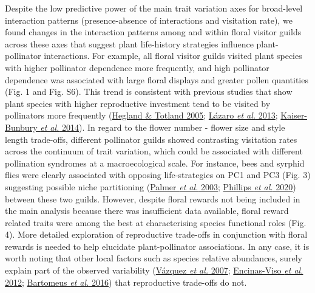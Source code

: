 \documentclass[
  12pt,
  a4paper,
]{article}
\begin{document}
Despite the low predictive power of the main trait variation axes for broad-level interaction patterns (presence-absence of interactions and visitation rate), we found changes in the interaction patterns among and within floral visitor guilds across these axes that suggest plant life-history strategies influence plant-pollinator interactions. For example, all floral visitor guilds visited plant species with higher pollinator dependence more frequently, and high pollinator dependence was associated with large floral displays and greater pollen quantities (Fig. 1 and Fig. S6). This trend is consistent with previous studies that show plant species with higher reproductive investment tend to be visited by pollinators more frequently (\protect\hyperlink{ref-hegland2005}{Hegland \& Totland 2005}; \protect\hyperlink{ref-lazaro2013}{Lázaro \emph{et al.} 2013}; \protect\hyperlink{ref-kaiser2014}{Kaiser-Bunbury \emph{et al.} 2014}). In regard to the flower number - flower size and style length trade-offs, different pollinator guilds showed contrasting visitation rates across the continuum of trait variation, which could be associated with different pollination syndromes at a macroecological scale. For instance, bees and syrphid flies were clearly associated with opposing life-strategies on PC1 and PC3 (Fig. 3) suggesting possible niche partitioning (\protect\hyperlink{ref-palmer2003}{Palmer \emph{et al.} 2003}; \protect\hyperlink{ref-phillips2020}{Phillips \emph{et al.} 2020}) between these two guilds. However, despite floral rewards not being included in the main analysis because there was insufficient data available, floral reward related traits were among the best at characterising species functional roles (Fig. 4). More detailed exploration of reproductive trade-offs in conjunction with floral rewards is needed to help elucidate plant-pollinator associations. In any case, it is worth noting that other local factors such as species relative abundances, surely explain part of the observed variability (\protect\hyperlink{ref-vazquez2007}{Vázquez \emph{et al.} 2007}; \protect\hyperlink{ref-encinas2012}{Encinas-Viso \emph{et al.} 2012}; \protect\hyperlink{ref-bartomeus2016}{Bartomeus \emph{et al.} 2016}) that reproductive trade-offs do not.
\end{document}

